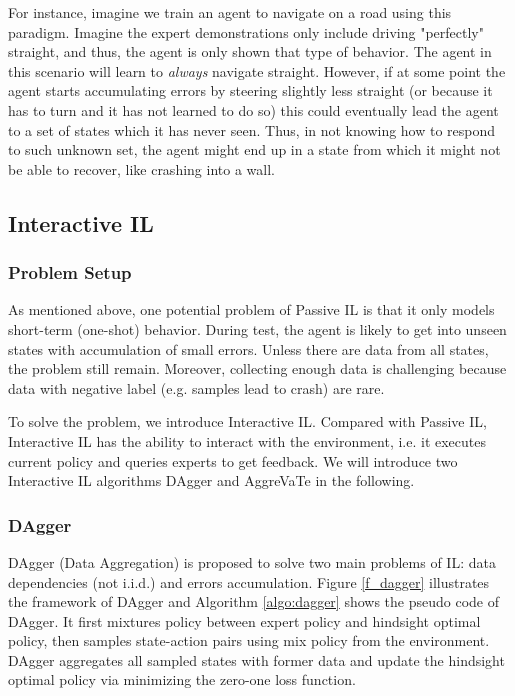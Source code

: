 \documentclass[11pt]{article}
\begin{document}
For instance, imagine we train an agent to navigate on a road using this paradigm. Imagine the expert demonstrations only include driving "perfectly" straight, and thus, the agent is only shown that type of behavior. The agent in this scenario will learn to \textit{always} navigate straight. However, if at some point the agent starts accumulating errors by steering slightly less straight (or because it has to turn and it has not learned to do so) this could eventually lead the agent to a set of states which it has never seen. Thus, in not knowing how to respond to such unknown set, the agent might end up in a state from which it might not be able to recover, like crashing into a wall. 

\subsection{Interactive IL}

\subsubsection{Problem Setup}

As mentioned above, one potential problem of Passive IL is that it only models short-term (one-shot) behavior. During test, the agent is likely to get into unseen states with accumulation of small errors. Unless there are data from all states, the problem still remain. Moreover, collecting enough data is challenging because data with negative label (e.g. samples lead to crash) are rare.

To solve the problem, we introduce Interactive IL. Compared with Passive IL, Interactive IL has the ability to interact with the environment, i.e. it executes current policy and queries experts to get feedback. We will introduce two Interactive IL algorithms DAgger and AggreVaTe in the following.

\subsubsection{DAgger}
DAgger (Data Aggregation) \cite{ross2011reduction} is proposed to solve two main problems of IL: data dependencies (not i.i.d.) and errors accumulation. Figure \ref{f_dagger} illustrates the framework of DAgger and Algorithm \ref{algo:dagger} shows the pseudo code of DAgger. It first mixtures policy between expert policy and hindsight optimal policy, then samples state-action pairs using mix policy from the environment. DAgger aggregates all sampled states with former data and update the hindsight optimal policy via minimizing the zero-one loss function. 
\end{document}

